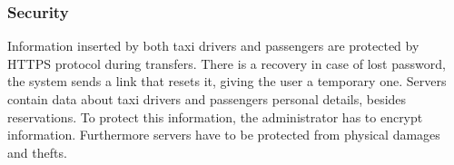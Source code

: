 \documentclass[a4paper,12pt]{article}%
\begin{document}
\subsubsection{Security}
Information inserted by both taxi drivers and passengers are protected by HTTPS protocol during transfers. There is a recovery in case of lost password, the system sends a link that resets it, giving the user a temporary one.
\newline
Servers contain data about taxi drivers and passengers personal details, besides reservations. To protect this information, the administrator has to encrypt information. Furthermore servers have to be protected from physical damages and thefts.
\end{document}
